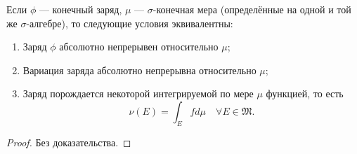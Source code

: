 \begin{theorem}
    Если $\phi$ — конечный заряд, $\mu$ — $\sigma$-конечная мера (определённые на одной и той же $\sigma$-алгебре), то следующие условия эквивалентны:
    \begin{enumerate}
        \item Заряд $\phi$ абсолютно непрерывен относительно $\mu$;
        \item Вариация заряда абсолютно непрерывна относительно $\mu$;
        \item Заряд порождается некоторой интегрируемой по мере $\mu$ функцией, то есть
        \[\nu(E) = \int_E f d\mu \quad \forall E \in \mathfrak{M}.\]
    \end{enumerate}
\end{theorem} 
\begin{proof}
    Без доказательства.
\end{proof} 
